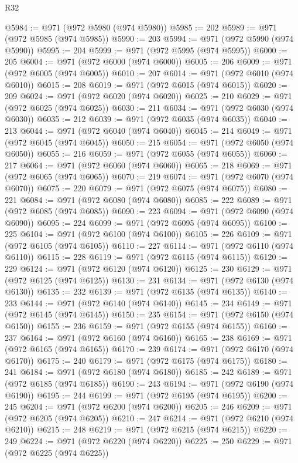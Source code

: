 \begin{lexlean}{R32}
\begin{coremodule}
@5984 := @971 (@972 @5980 (@974 @5980))
@5985 := 202
@5989 := @971 (@972 @5985 (@974 @5985))
@5990 := 203
@5994 := @971 (@972 @5990 (@974 @5990))
@5995 := 204
@5999 := @971 (@972 @5995 (@974 @5995))
@6000 := 205
@6004 := @971 (@972 @6000 (@974 @6000))
@6005 := 206
@6009 := @971 (@972 @6005 (@974 @6005))
@6010 := 207
@6014 := @971 (@972 @6010 (@974 @6010))
@6015 := 208
@6019 := @971 (@972 @6015 (@974 @6015))
@6020 := 209
@6024 := @971 (@972 @6020 (@974 @6020))
@6025 := 210
@6029 := @971 (@972 @6025 (@974 @6025))
@6030 := 211
@6034 := @971 (@972 @6030 (@974 @6030))
@6035 := 212
@6039 := @971 (@972 @6035 (@974 @6035))
@6040 := 213
@6044 := @971 (@972 @6040 (@974 @6040))
@6045 := 214
@6049 := @971 (@972 @6045 (@974 @6045))
@6050 := 215
@6054 := @971 (@972 @6050 (@974 @6050))
@6055 := 216
@6059 := @971 (@972 @6055 (@974 @6055))
@6060 := 217
@6064 := @971 (@972 @6060 (@974 @6060))
@6065 := 218
@6069 := @971 (@972 @6065 (@974 @6065))
@6070 := 219
@6074 := @971 (@972 @6070 (@974 @6070))
@6075 := 220
@6079 := @971 (@972 @6075 (@974 @6075))
@6080 := 221
@6084 := @971 (@972 @6080 (@974 @6080))
@6085 := 222
@6089 := @971 (@972 @6085 (@974 @6085))
@6090 := 223
@6094 := @971 (@972 @6090 (@974 @6090))
@6095 := 224
@6099 := @971 (@972 @6095 (@974 @6095))
@6100 := 225
@6104 := @971 (@972 @6100 (@974 @6100))
@6105 := 226
@6109 := @971 (@972 @6105 (@974 @6105))
@6110 := 227
@6114 := @971 (@972 @6110 (@974 @6110))
@6115 := 228
@6119 := @971 (@972 @6115 (@974 @6115))
@6120 := 229
@6124 := @971 (@972 @6120 (@974 @6120))
@6125 := 230
@6129 := @971 (@972 @6125 (@974 @6125))
@6130 := 231
@6134 := @971 (@972 @6130 (@974 @6130))
@6135 := 232
@6139 := @971 (@972 @6135 (@974 @6135))
@6140 := 233
@6144 := @971 (@972 @6140 (@974 @6140))
@6145 := 234
@6149 := @971 (@972 @6145 (@974 @6145))
@6150 := 235
@6154 := @971 (@972 @6150 (@974 @6150))
@6155 := 236
@6159 := @971 (@972 @6155 (@974 @6155))
@6160 := 237
@6164 := @971 (@972 @6160 (@974 @6160))
@6165 := 238
@6169 := @971 (@972 @6165 (@974 @6165))
@6170 := 239
@6174 := @971 (@972 @6170 (@974 @6170))
@6175 := 240
@6179 := @971 (@972 @6175 (@974 @6175))
@6180 := 241
@6184 := @971 (@972 @6180 (@974 @6180))
@6185 := 242
@6189 := @971 (@972 @6185 (@974 @6185))
@6190 := 243
@6194 := @971 (@972 @6190 (@974 @6190))
@6195 := 244
@6199 := @971 (@972 @6195 (@974 @6195))
@6200 := 245
@6204 := @971 (@972 @6200 (@974 @6200))
@6205 := 246
@6209 := @971 (@972 @6205 (@974 @6205))
@6210 := 247
@6214 := @971 (@972 @6210 (@974 @6210))
@6215 := 248
@6219 := @971 (@972 @6215 (@974 @6215))
@6220 := 249
@6224 := @971 (@972 @6220 (@974 @6220))
@6225 := 250
@6229 := @971 (@972 @6225 (@974 @6225))

\end{coremodule}
\end{lexlean}
